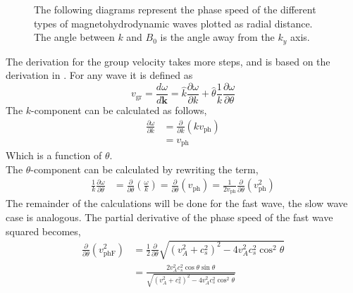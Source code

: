 \documentclass[a4paper]{article}
\begin{document}
\begin{figure}[h]
	\caption{The following diagrams represent the phase speed of the different types of magnetohydrodynamic waves plotted as radial distance. The angle between $k$ and $B_0$ is the angle away from the $k_y$ axis.}\label{fig:friedrich_diagrams}
\end{figure}

The derivation for the group velocity takes more steps, and is based on the derivation in \cite{Lyu2014}. For any wave it is defined as 
\begin{equation*}
    v_{\text{gr}} = \frac{d\omega}{d\mathbf{k}} = \hat{k}\frac{\partial\omega}{\partial k} + \hat{\theta} \frac{1}{k}\frac{\partial\omega}{\partial\theta}
\end{equation*}
The $k$-component can be calculated as follows,
\begin{align*}
    \frac{\partial \omega}{\partial k} &= \frac{\partial}{\partial k}\left(kv_{\text{ph}}\right)\\
    &= v_{\text{ph}}
\end{align*}
Which is a function of $\theta$.\\
The $\theta$-component can be calculated by rewriting the term,
\begin{align*}
    \frac{1}{k}\frac{\partial \omega}{\partial \theta} &= \frac{\partial}{\partial \theta}\left(\frac{\omega}{k}\right)
    = \frac{\partial}{\partial \theta}(v_{\text{ph}}) = \frac{1}{2v_{\text{ph}}} \frac{\partial}{\partial \theta}(v^2_{\text{ph}})
\end{align*}
The remainder of the calculations will be done for the fast wave, the slow wave case is analogous. The partial derivative of the phase speed of the fast wave squared becomes,
\begin{align*}
     \frac{\partial}{\partial \theta}(v^2_{\text{phF}})&= \frac{1}{2}\frac{\partial}{\partial \theta} \sqrt{(v_A^2 + c_s^2)^2 - 4v_A^2c_s^2\cos^2\theta}\\
     &= \frac{2v_A^2c_s^2\cos\theta\sin\theta}{\sqrt{(v_A^2 + c_s^2)^2 - 4v_A^2c_s^2\cos^2\theta}}
\end{align*}
\end{document}
